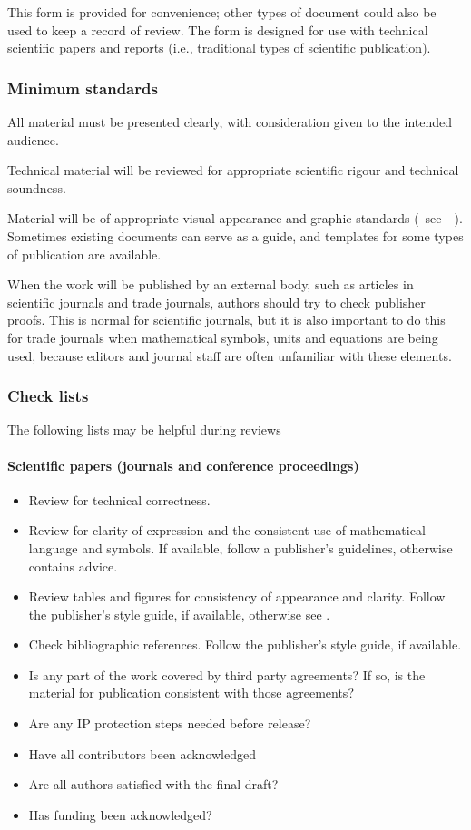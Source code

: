 This form is provided for convenience; other types of document could also be used to keep a record of review. The form is designed for use with technical scientific papers and reports (i.e., traditional types of scientific publication).  

\subsubsection{Minimum standards}
All material must be presented clearly, with consideration given to the intended audience.

Technical material will be reviewed for appropriate scientific rigour and technical soundness. 

Material will be of appropriate visual appearance and graphic standards (~see~\cite[\S\ref*{GRP-s:scientific_documents}]{MSL_Reporting_Guidelines}~). Sometimes existing documents can serve as a guide, and templates for some types of publication are available.  

When the work will be published by an external body, such as articles in scientific journals and trade journals, authors should try to check publisher proofs. This is normal for scientific journals, but it is also important to do this for trade journals when mathematical symbols, units and equations are being used, because editors and journal staff are often unfamiliar with these elements.  

\subsubsection{Check lists}
The following lists may be helpful during reviews
\paragraph{Scientific papers (journals and conference proceedings)}
\begin{itemize}
\item  Review for technical correctness.
\item  Review for clarity of expression and the consistent use of mathematical language and symbols.  If available, follow a publisher’s guidelines, otherwise \cite[\S\ref*{GRP-s:scientific_documents}]{MSL_Reporting_Guidelines} contains advice.
\item  Review tables and figures for consistency of appearance and clarity. Follow the publisher’s style guide, if available, otherwise see \cite[\S\ref*{GRP-s:scientific_documents}]{MSL_Reporting_Guidelines}.
\item  Check bibliographic references. Follow the publisher’s style guide, if available.
\item  Is any part of the work covered by third party agreements? If so, is the material for publication consistent with those agreements? 
\item  Are any IP protection steps needed before release?
\item  Have all contributors been acknowledged
\item  Are all authors satisfied with the final draft?
\item  Has funding been acknowledged?
\end{itemize}

